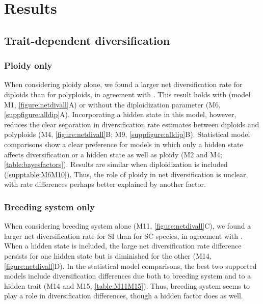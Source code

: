 \section{Results}


\subsection{Trait-dependent diversification}

\subsubsection{Ploidy only}

When considering ploidy alone, we found a larger net diversification rate for diploids than for polyploids, in agreement with \citet{mayrose_2011, mayrose_2015}.
This result holds with (model M1, \cref{figure:netdivall}A) or without the diploidization parameter (M6, \cref{suppfigure:alldip}A).
Incorporating a hidden state in this model, however, reduces the clear separation in diversification rate estimates between diploids and polyploids (M4, \cref{figure:netdivall}B; M9, \cref{suppfigure:alldip}B).
Statistical model comparisons show a clear preference for models in which only a hidden state affects diversification or a hidden state as well as ploidy (M2 and M4; \cref{table:bayesfactors}).
Results are similar when diploidization is included (\cref{supptable:M6M10}).
Thus, the role of ploidy in net diversification is unclear, with rate differences perhaps better explained by another factor.

\subsubsection{Breeding system only}

When considering breeding system alone (M11, \cref{figure:netdivall}C), we found a larger net diversification rate for SI than for SC species, in agreement with \citet{goldberg_2010}.
When a hidden state is included, the large net diversification rate difference persists for one hidden state but is diminished for the other (M14, \cref{figure:netdivall}D).
In the statistical model comparisons, the best two supported models include diversification differences due both to breeding system and to a hidden trait (M14 and M15, \cref{table:M11M15}).
Thus, breeding system seems to play a role in diversification differences, though a hidden factor does as well.

